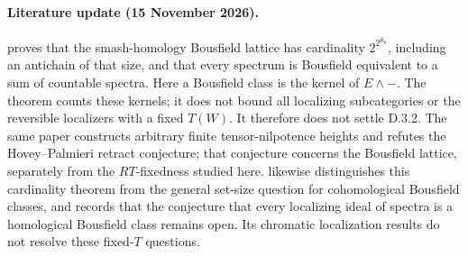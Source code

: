 \paragraph{Literature update (15 November 2026).}
\citet[Theorem~1.4]{EH5Putzstuck2026} proves that the smash-homology
Bousfield lattice has cardinality $2^{2^{\aleph_0}}$, including an antichain
of that size, and that every spectrum is Bousfield equivalent to a sum of
countable spectra. Here a Bousfield class is the kernel of $E\wedge-$.
The theorem counts these kernels; it does not bound all localizing
subcategories or the reversible localizers with a fixed $T(W)$.
It therefore does not settle D.3.2. The same paper constructs arbitrary
finite tensor-nilpotence heights and refutes the Hovey--Palmieri retract
conjecture; that conjecture concerns the Bousfield lattice, separately
from the $RT$-fixedness studied here.
\citet[Remarks~2.3, 2.9 and 2.10]{EH5BCHSZ2026} likewise distinguishes
this cardinality theorem from the general set-size question for
cohomological Bousfield classes, and records that the conjecture that
every localizing ideal of spectra is a homological Bousfield class
remains open. Its chromatic localization results do not resolve these
fixed-$T$ questions.








